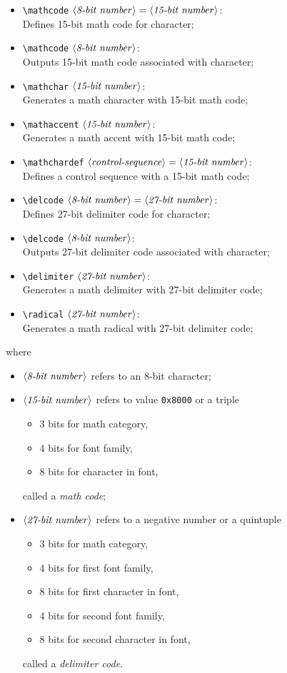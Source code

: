 \documentclass[fleqn]{article}
\newcommand{\bits}[1]{\langle\mbox{\emph{#1-bit number}}\rangle}
\newcommand{\showcs}{\langle\mbox{\emph{control-sequence}}\rangle}
\begin{document}
\begin{itemize}
\item \verb|\mathcode| $\bits{8}=\bits{15}$:\\
Defines 15-bit math code for character;
\item \verb|\mathcode| $\bits{8}$:\\
Outputs 15-bit math code associated with character;
\item \verb|\mathchar| $\bits{15}$:\\
Generates a math character with 15-bit math code;
\item \verb|\mathaccent| $\bits{15}$:\\
Generates a math accent with 15-bit math code;
\item \verb|\mathchardef| $\showcs=\bits{15}$:\\
Defines a control sequence with a 15-bit math code;
\item \verb|\delcode| $\bits{8}=\bits{27}$:\\
Defines 27-bit delimiter code for character;
\item \verb|\delcode| $\bits{8}$:\\
Outputs 27-bit delimiter code associated with character;
\item \verb|\delimiter| $\bits{27}$:\\
Generates a math delimiter with 27-bit delimiter code;
\item \verb|\radical| $\bits{27}$:\\
Generates a math radical with 27-bit delimiter code;
\end{itemize}
where
\begin{itemize}
\item $\bits{8}$ refers to an 8-bit character;
\item $\bits{15}$ refers to value \texttt{0x8000} or a triple
\begin{itemize}
\item 3 bits for math category,
\item 4 bits for font family,
\item 8 bits for character in font,
\end{itemize}
called a \emph{math code};
\item $\bits{27}$ refers to a negative number or a quintuple
\begin{itemize}
\item 3 bits for math category,
\item 4 bits for first font family,
\item 8 bits for first character in font,
\item 4 bits for second font family,
\item 8 bits for second character in font,
\end{itemize}
called a \emph{delimiter code}.
\end{itemize}
\end{document}
